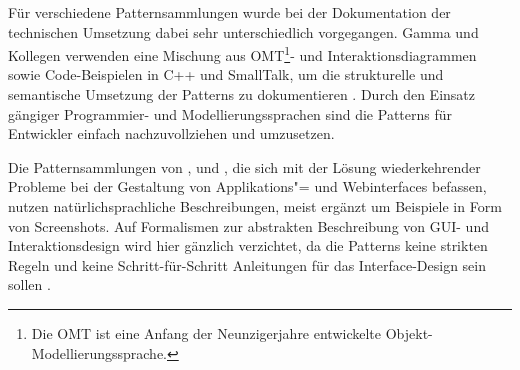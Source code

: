 Für verschiedene Patternsammlungen wurde bei der Dokumentation der technischen Umsetzung dabei sehr unterschiedlich vorgegangen. Gamma und Kollegen verwenden eine Mischung aus OMT\footnote{Die \ac{OMT} ist eine Anfang der Neunzigerjahre entwickelte Objekt-Modellierungssprache.}- und Interaktionsdiagrammen sowie Code-Beispielen in C++ und SmallTalk, um die strukturelle und semantische Umsetzung der Patterns zu dokumentieren \citep{Gamma1995}. Durch den Einsatz gängiger Programmier- und Modellierungssprachen sind die Patterns für Entwickler einfach nachzuvollziehen und umzusetzen.

Die Patternsammlungen von \cite{Tidwell2010}, \cite{Yahoo2015} und \cite{Welie2008}, die sich mit der Lösung wiederkehrender Probleme bei der Gestaltung von Applikations"= und Webinterfaces befassen, nutzen natürlichsprachliche Beschreibungen, meist ergänzt um  Beispiele in Form von Screenshots. Auf Formalismen zur abstrakten Beschreibung von GUI- und Interaktionsdesign wird hier gänzlich verzichtet, da die Patterns keine strikten Regeln und keine Schritt-für-Schritt Anleitungen für das Interface-Design sein sollen \citep[xviii]{Tidwell2010}. 

